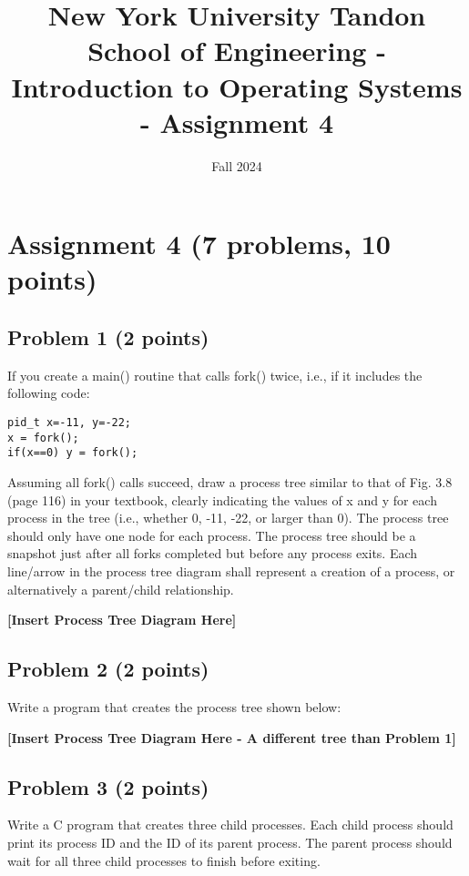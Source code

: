 \documentclass{article}
\title{New York University Tandon School of Engineering - Introduction to Operating Systems - Assignment 4}
\author{}
\date{Fall 2024}
\begin{document}
\maketitle

\section*{Assignment 4 (7 problems, 10 points)}

\subsection*{Problem 1 (2 points)}

If you create a main() routine that calls fork() twice, i.e., if it includes the following code:

\begin{verbatim}
pid_t x=-11, y=-22;
x = fork();
if(x==0) y = fork();
\end{verbatim}

Assuming all fork() calls succeed, draw a process tree similar to that of Fig. 3.8 (page 116) in your textbook, clearly indicating the values of x and y for each process in the tree (i.e., whether 0, -11, -22, or larger than 0). The process tree should only have one node for each process. The process tree should be a snapshot just after all forks completed but before any process exits. Each line/arrow in the process tree diagram shall represent a creation of a process, or alternatively a parent/child relationship.

\textbf{[Insert Process Tree Diagram Here]}


\subsection*{Problem 2 (2 points)}

Write a program that creates the process tree shown below:

\textbf{[Insert Process Tree Diagram Here -  A different tree than Problem 1]}


\subsection*{Problem 3 (2 points)}

Write a C program that creates three child processes. Each child process should print its process ID and the ID of its parent process.  The parent process should wait for all three child processes to finish before exiting.
\end{document}
